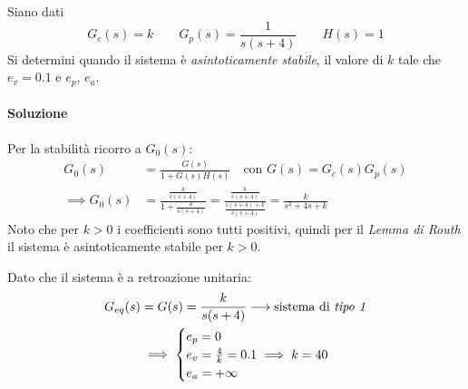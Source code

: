 \begin{esercizio}
Siano dati
\[
	G_c(s) = k \qquad G_p(s) = \frac{1}{s(s+4)} \qquad H(s) = 1
\]
Si determini quando il sistema è \emph{asintoticamente stabile}, il valore di \(k\) tale che \(e_v = 0.1\) e \(e_p\), \(e_a\).

\paragraph{Soluzione}
Per la stabilità ricorro a \(G_0(s)\):
\begin{align*}
	G_0(s) &= \frac{G(s)}{1+G(s)H(s)} \quad \text{con } G(s) = G_c(s)G_p(s) \\
	\implies G_0(s) &= \frac{\frac{k}{s(s+4)}}{1+\frac{k}{s(s+4)}} =
		\frac{\frac{k}{s(s+4)}}{\frac{s(s+4)+k}{s(s+4)}} =
		\frac{k}{s^2+4s+k}
\end{align*}
Noto che per \(k>0\) i coefficienti sono tutti positivi, quindi per il \emph{Lemma di Routh} il sistema è asintoticamente stabile per \(k>0\).

Dato che il sistema è a retroazione unitaria:
\begin{align*}
	G_{eq}(s) &= G(s) = \frac{k}{s(s+4)} \longrightarrow \text{sistema di \emph{tipo 1}} \\
	&\implies \begin{cases}
		e_p = 0 \\
		e_v = \frac{4}{k} = 0.1 \implies k=40 \\
		e_a = +\infty
	\end{cases}
\end{align*}
\end{esercizio}

